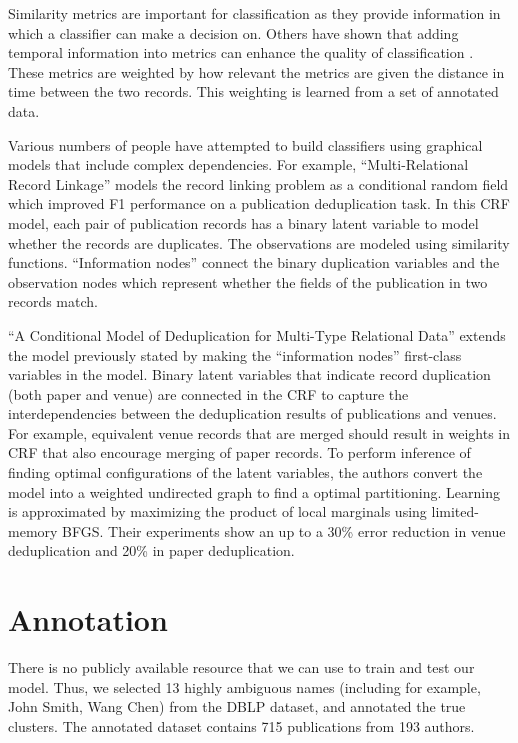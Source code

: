 \documentclass[twocolumn,letterpaper]{article}
\begin{document}
Similarity metrics are important for classification as they provide information in which a classifier can make a decision on. Others have shown that adding temporal information into metrics can enhance the quality of classification \cite{DBLP:journals/fcsc/LiDMS12}. These metrics are weighted by how relevant the metrics are given the distance in time between the two records. This weighting is learned from a set of annotated data.

Various numbers of people have attempted to build classifiers using graphical models that include complex dependencies. For example, ``Multi-Relational Record Linkage'' \cite{Domingos04multi} models the record linking problem as a conditional random field which improved F1 performance on a publication deduplication task. In this CRF model, each pair of publication records has a binary latent variable to model whether the records are duplicates.  The observations are modeled using similarity functions.  ``Information nodes'' connect the binary duplication variables and the observation nodes which represent whether the fields of the publication in two records match.

``A Conditional Model of Deduplication for Multi-Type Relational Data'' \cite{Culotta05aconditional} extends the model previously stated by making the ``information nodes'' first-class variables in the model.  Binary latent variables that indicate record duplication (both paper and venue) are connected in the CRF to capture the interdependencies between the deduplication results of publications and venues.  For example, equivalent venue records that are merged should result in weights in CRF that also encourage merging of paper records.  To perform inference of finding optimal configurations of the latent variables, the authors convert the model into a weighted undirected graph to find a optimal partitioning.  Learning is approximated by maximizing the product of local marginals using limited-memory BFGS.  Their experiments show an up to a 30\% error reduction in venue deduplication and 20\% in paper deduplication.

\section{Annotation} %
\label{sec:annotation}
There is no publicly available resource that we can use to train and test our model.  Thus, we selected 13 highly ambiguous names (including for example, John Smith, Wang Chen) from the DBLP dataset, and annotated the true clusters.  The annotated dataset contains 715 publications from 193 authors.
\end{document}
